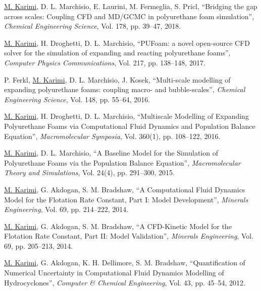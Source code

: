 \documentclass[10pt,a4]{article}
\newcounter{myEnumCounter}
\newcounter{mySaveCounter}
\renewenvironment{enumerate}{%
  \begin{list}{\arabic{myEnumCounter}.}{\usecounter{myEnumCounter}%
  \setcounter{myEnumCounter}{\value{mySaveCounter}}}
  }{%
  \setcounter{mySaveCounter}{\value{myEnumCounter}}\end{list}%
}
\newcommand{\quotes}[1]{``#1''}
\begin{document}
\begin{small}
\begin{enumerate}
	\item 
\underline{M. Karimi}, D. L. Marchisio, E. Laurini, M. Fermeglia, S. Pricl, \quotes{Bridging the gap across scales: Coupling CFD and MD/GCMC in polyurethane foam simulation}, \textit{Chemical Engineering Science}, Vol. 178, pp. 39--47, 2018.

	\item 
\underline{M. Karimi}, H. Droghetti, D. L. Marchisio, \quotes{PUFoam: a novel open-source CFD solver for the simulation of expanding and reacting polyurethane foams}, \textit{Computer Physics Communications}, Vol. 217, pp. 138--148, 2017.

	\item
P. Ferkl, \underline{M. Karimi}, D. L. Marchisio, J. Kosek, \quotes{Multi-scale modelling of expanding polyurethane foams: coupling macro- and bubble-scales}, \textit{Chemical Engineering Science}, Vol. 148, pp. 55--64, 2016.
	
    \item
\underline{M. Karimi}, H. Droghetti, D. L. Marchisio, \quotes{Multiscale Modelling of Expanding Polyurethane Foams via Computational Fluid Dynamics and Population Balance Equation},  \textit{Macromolecular Symposia}, Vol. 360(1), pp. 108--122, 2016.

	\item
\underline{M. Karimi}, D. L. Marchisio, \quotes{A Baseline Model for the Simulation of Polyurethane Foams via the Population Balance Equation}, \textit{Macromolecular Theory and Simulations}, Vol. 24(4), pp. 291--300, 2015.
	
	\item
\underline{M. Karimi}, G. Akdogan, S. M. Bradshaw, \quotes{A Computational Fluid Dynamics Model for the Flotation Rate Constant, Part I: Model Development}, \textit{Minerals Engineering}, Vol. 69, pp. 214--222, 2014.

	\item
\underline{M. Karimi}, G. Akdogan, S. M. Bradshaw, \quotes{A CFD-Kinetic Model for the Flotation Rate Constant, Part II: Model Validation}, \textit{Minerals Engineering}, Vol. 69, pp. 205--213, 2014.
	
	\item
\underline{M. Karimi}, G. Akdogan, K. H. Dellimore, S. M. Bradshaw, \quotes{Quantification of Numerical Uncertainty in Computational Fluid Dynamics Modelling of Hydrocyclones}, \textit{Computer \& Chemical Engineering}, Vol. 43, pp. 45--54, 2012. 


\end{enumerate}
\end{small}
\end{document}
